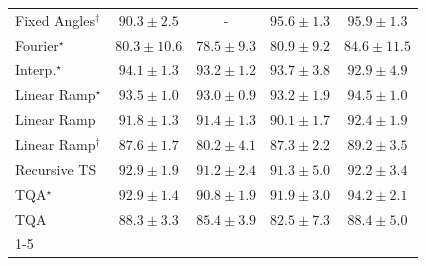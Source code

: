 \begin{tabular}{l|cccc|}
Fixed Angles$^\dagger$ & {\cellcolor[HTML]{045B8F}} \color[HTML]{F1F1F1} $90.3\pm 2.5$ & {\cellcolor[HTML]{000000}} \color[HTML]{F1F1F1} {\cellcolor{white}} \color{black} - & {\cellcolor[HTML]{023D60}} \color[HTML]{F1F1F1} $95.6\pm 1.3$ & {\cellcolor[HTML]{023B5D}} \color[HTML]{F1F1F1} $95.9\pm 1.3$ \\
Fourier$^\star$ & {\cellcolor[HTML]{2D8ABD}} \color[HTML]{F1F1F1} $80.3\pm 10.6$ & {\cellcolor[HTML]{4094C3}} \color[HTML]{F1F1F1} $78.5\pm 9.3$ & {\cellcolor[HTML]{2987BC}} \color[HTML]{F1F1F1} $80.9\pm 9.2$ & {\cellcolor[HTML]{0872B1}} \color[HTML]{F1F1F1} $84.6\pm 11.5$ \\
Interp.$^\star$ & {\cellcolor[HTML]{03466E}} \color[HTML]{F1F1F1} $94.1\pm 1.3$ & {\cellcolor[HTML]{034B76}} \color[HTML]{F1F1F1} $93.2\pm 1.2$ & {\cellcolor[HTML]{034871}} \color[HTML]{F1F1F1} $93.7\pm 3.8$ & {\cellcolor[HTML]{034D79}} \color[HTML]{F1F1F1} $92.9\pm 4.9$ \\
Linear Ramp$^\star$ & {\cellcolor[HTML]{034973}} \color[HTML]{F1F1F1} $93.5\pm 1.0$ & {\cellcolor[HTML]{034C78}} \color[HTML]{F1F1F1} $93.0\pm 0.9$ & {\cellcolor[HTML]{034B76}} \color[HTML]{F1F1F1} $93.2\pm 1.9$ & {\cellcolor[HTML]{03446A}} \color[HTML]{F1F1F1} $94.5\pm 1.0$ \\
Linear Ramp & {\cellcolor[HTML]{045483}} \color[HTML]{F1F1F1} $91.8\pm 1.3$ & {\cellcolor[HTML]{045687}} \color[HTML]{F1F1F1} $91.4\pm 1.3$ & {\cellcolor[HTML]{045C90}} \color[HTML]{F1F1F1} $90.1\pm 1.7$ & {\cellcolor[HTML]{03517E}} \color[HTML]{F1F1F1} $92.4\pm 1.9$ \\
Linear Ramp$^\dagger$ & {\cellcolor[HTML]{0566A0}} \color[HTML]{F1F1F1} $87.6\pm 1.7$ & {\cellcolor[HTML]{2F8BBE}} \color[HTML]{F1F1F1} $80.2\pm 4.1$ & {\cellcolor[HTML]{0567A2}} \color[HTML]{F1F1F1} $87.3\pm 2.2$ & {\cellcolor[HTML]{046096}} \color[HTML]{F1F1F1} $89.2\pm 3.5$ \\
Recursive TS & {\cellcolor[HTML]{034D79}} \color[HTML]{F1F1F1} $92.9\pm 1.9$ & {\cellcolor[HTML]{045788}} \color[HTML]{F1F1F1} $91.2\pm 2.4$ & {\cellcolor[HTML]{045788}} \color[HTML]{F1F1F1} $91.3\pm 5.0$ & {\cellcolor[HTML]{045280}} \color[HTML]{F1F1F1} $92.2\pm 3.4$ \\
TQA$^\star$ & {\cellcolor[HTML]{034D79}} \color[HTML]{F1F1F1} $92.9\pm 1.4$ & {\cellcolor[HTML]{045A8D}} \color[HTML]{F1F1F1} $90.8\pm 1.9$ & {\cellcolor[HTML]{045382}} \color[HTML]{F1F1F1} $91.9\pm 3.0$ & {\cellcolor[HTML]{03456C}} \color[HTML]{F1F1F1} $94.2\pm 2.1$ \\
TQA & {\cellcolor[HTML]{04649D}} \color[HTML]{F1F1F1} $88.3\pm 3.3$ & {\cellcolor[HTML]{056FAE}} \color[HTML]{F1F1F1} $85.4\pm 3.9$ & {\cellcolor[HTML]{1B7EB7}} \color[HTML]{F1F1F1} $82.5\pm 7.3$ & {\cellcolor[HTML]{04639B}} \color[HTML]{F1F1F1} $88.4\pm 5.0$ \\
\cline{1-5}
\bottomrule
\end{tabular}
